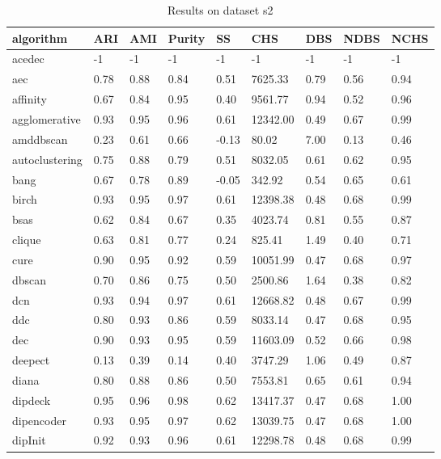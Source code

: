 \begin{table}[H]
\centering
\caption{Results on dataset s2}
\label{S66_Table}
\begin{tabular}{|l|l|l|l|l|l|l|l|l|}
\hline
algorithm & ARI & AMI & Purity & SS & CHS & DBS & NDBS & NCHS \\
\hline
acedec & -1 & -1 & -1 & -1 & -1 & -1 & -1 & -1 \\
\hline
aec & 0.78 & 0.88 & 0.84 & 0.51 & 7625.33 & 0.79 & 0.56 & 0.94 \\
\hline
affinity & 0.67 & 0.84 & 0.95 & 0.40 & 9561.77 & 0.94 & 0.52 & 0.96 \\
\hline
agglomerative & 0.93 & 0.95 & 0.96 & 0.61 & 12342.00 & 0.49 & 0.67 & 0.99 \\
\hline
amddbscan & 0.23 & 0.61 & 0.66 & -0.13 & 80.02 & 7.00 & 0.13 & 0.46 \\
\hline
autoclustering & 0.75 & 0.88 & 0.79 & 0.51 & 8032.05 & 0.61 & 0.62 & 0.95 \\
\hline
bang & 0.67 & 0.78 & 0.89 & -0.05 & 342.92 & 0.54 & 0.65 & 0.61 \\
\hline
birch & 0.93 & 0.95 & 0.97 & 0.61 & 12398.38 & 0.48 & 0.68 & 0.99 \\
\hline
bsas & 0.62 & 0.84 & 0.67 & 0.35 & 4023.74 & 0.81 & 0.55 & 0.87 \\
\hline
clique & 0.63 & 0.81 & 0.77 & 0.24 & 825.41 & 1.49 & 0.40 & 0.71 \\
\hline
cure & 0.90 & 0.95 & 0.92 & 0.59 & 10051.99 & 0.47 & 0.68 & 0.97 \\
\hline
dbscan & 0.70 & 0.86 & 0.75 & 0.50 & 2500.86 & 1.64 & 0.38 & 0.82 \\
\hline
dcn & 0.93 & 0.94 & 0.97 & 0.61 & 12668.82 & 0.48 & 0.67 & 0.99 \\
\hline
ddc & 0.80 & 0.93 & 0.86 & 0.59 & 8033.14 & 0.47 & 0.68 & 0.95 \\
\hline
dec & 0.90 & 0.93 & 0.95 & 0.59 & 11603.09 & 0.52 & 0.66 & 0.98 \\
\hline
deepect & 0.13 & 0.39 & 0.14 & 0.40 & 3747.29 & 1.06 & 0.49 & 0.87 \\
\hline
diana & 0.80 & 0.88 & 0.86 & 0.50 & 7553.81 & 0.65 & 0.61 & 0.94 \\
\hline
dipdeck & 0.95 & 0.96 & 0.98 & 0.62 & 13417.37 & 0.47 & 0.68 & 1.00 \\
\hline
dipencoder & 0.93 & 0.95 & 0.97 & 0.62 & 13039.75 & 0.47 & 0.68 & 1.00 \\
\hline
dipInit & 0.92 & 0.93 & 0.96 & 0.61 & 12298.78 & 0.48 & 0.68 & 0.99 \\

\end{tabular}
\end{table}
